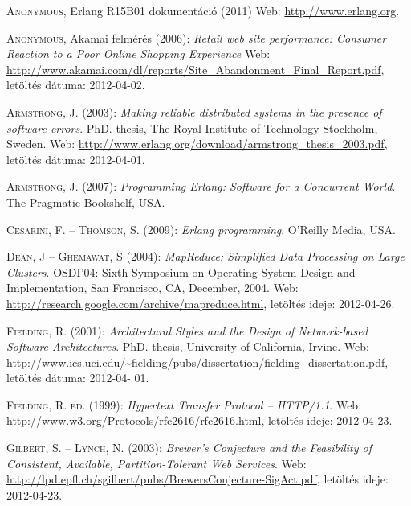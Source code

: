\documentclass[12pt, a4paper, oneside]{book}
\begin{document}
\begin{thebibliography}{9}

{\scshape Anonymous}, Erlang R15B01 dokumentáció (2011) Web:
\url{http://www.erlang.org}.

{\scshape Anonymous}, Akamai felmérés (2006): \emph{Retail web site performance: Consumer Reaction to a Poor Online
Shopping Experience} Web:
\url{http://www.akamai.com/dl/reports/Site_Abandonment_Final_Report.pdf},
letöltés dátuma: 2012-04-02.

{\scshape Armstrong, J.} (2003): \emph{Making reliable distributed systems in the presence of software errors}. PhD.
thesis, The Royal Institute of Technology Stockholm, Sweden. Web:
\url{http://www.erlang.org/download/armstrong_thesis_2003.pdf}, letöltés
dátuma: 2012-04-01.

{\scshape Armstrong, J.} (2007): \emph{Programming Erlang: Software for a Concurrent World}. The Pragmatic
Bookshelf, USA.

{\scshape Cesarini, F. -- Thomson, S.} (2009): \emph{Erlang programming}.
O'Reilly Media, USA.

{\scshape Dean, J -- Ghemawat, S} (2004): \emph{MapReduce: Simplified Data
Processing on Large Clusters}. OSDI'04: Sixth Symposium on Operating System
Design and Implementation, San Francisco, CA, December, 2004. Web:
\url{http://research.google.com/archive/mapreduce.html}, letöltés ideje: 2012-04-26.

{\scshape Fielding, R.} (2001): \emph{Architectural Styles and the Design of Network-based Software
Architectures}. PhD. thesis, University of California, Irvine. Web:
\url{http://www.ics.uci.edu/~fielding/pubs/dissertation/fielding_dissertation.pdf}, letöltés dátuma: 2012-04-
01.

{\scshape Fielding, R. ed.} (1999): \emph{Hypertext Transfer Protocol --
HTTP/1.1}. Web: \url{http://www.w3.org/Protocols/rfc2616/rfc2616.html},
letöltés ideje: 2012-04-23.

{\scshape Gilbert, S. -- Lynch, N.} (2003): \emph{Brewer’s Conjecture and the
Feasibility of Consistent, Available, Partition-Tolerant Web Services}. Web:
\url{http://lpd.epfl.ch/sgilbert/pubs/BrewersConjecture-SigAct.pdf}, letöltés
ideje: 2012-04-23.


\end{thebibliography}
\end{document}
